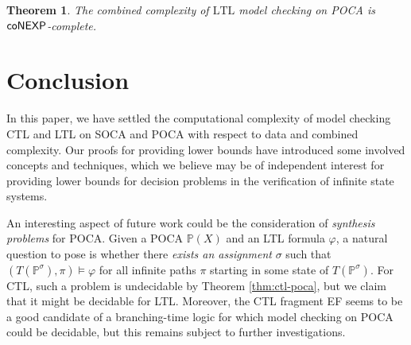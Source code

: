 \documentclass[times,envcountsame]{llncs}
\newtheorem{theorem}{{\bf Theorem}}[section]
\newcommand{\Poca}{\mathbb{P}}
\newcommand{\ltl}{\text{LTL}}
\begin{document}
\begin{theorem}
  The combined complexity of $\ltl$ model checking on POCA is
  ${\mathsf{coNEXP}}$-complete.
\end{theorem}

\section{Conclusion}{\label{S Concl}}

In this paper, we have settled the computational complexity of model
checking CTL and LTL on SOCA and POCA with respect to data and
combined complexity. Our proofs for providing lower bounds have
introduced some involved concepts and techniques, which we believe may
be of independent interest for providing lower bounds for decision
problems in the verification of infinite state systems.

An interesting aspect of future work could be the consideration of
\emph{synthesis problems} for POCA. Given a POCA $\Poca(X)$ and an LTL
formula $\varphi$, a natural question to pose is whether there
\emph{exists an assignment} $\sigma$ such that $(T(\Poca^\sigma),
\pi)\models \varphi$ for all infinite paths $\pi$ starting in some
state of $T(\Poca^\sigma)$.  For CTL, such a problem is undecidable by
Theorem \ref{thm:ctl-poca}, but we claim that it might be decidable
for LTL. Moreover, the CTL fragment EF seems to be a good candidate of
a branching-time logic for which model checking on POCA could be
decidable, but this remains subject to further investigations.








\iffalse

\begin{thebibliography}{1}


\bibitem{GoLo10}
S.~G\"oller, M.~Lohrey.
\newblock Branchning-time model checking of one-counter processes.
\newblock In Proceedings of STACS 2010, to appear
\newblock {\em Arxiv:0909.1102v1}

\end{thebibliography}
\fi
\end{document}

